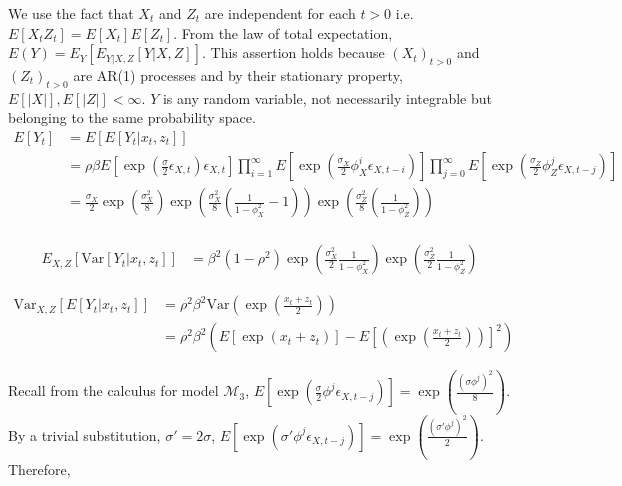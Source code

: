 \documentclass[11pt,a4,twosided,singlespacing,titlepagenumber=on]{scrreprt}
\numberwithin{equation}{chapter} %
\theoremstyle{remark}
\begin{document}
\noindent
We use the fact that $X_t$ and $Z_t$ are independent for each $t > 0$ i.e. $E[X_t Z_t] = E[X_t] E[Z_t]$.
\noindent
From the law of total expectation, $E(Y) = E_Y\left[ E_{Y|X,Z}[Y | X, Z] \right]$. This assertion holds because $(X_t)_{t>0}$ and $(Z_t)_{t>0}$ are AR(1) processes and by their stationary property, $E[|X|],E[|Z|] < \infty$. $Y$ is any random variable, not necessarily integrable but belonging to the same probability space.
\begin{align*}
E\left[ Y_t \right] &= E\left[ E[Y_t | x_t, z_t] \right] \\
                                  &= \rho \beta E\left[\exp \left( \frac{\sigma}{2} \epsilon_{X,t} \right) \epsilon_{X,t} \right] \prod_{i=1}^\infty E\left[\exp \left( \frac{\sigma_X}{2} \phi_X^i \epsilon_{X, t-i} \right)  \right]  \prod_{j=0}^\infty E\left[\exp \left( \frac{\sigma_Z}{2} \phi_Z^j \epsilon_{X, t-j} \right)  \right] \\
                  &= \frac{\sigma_X}{2} \exp \left(\frac{\sigma_X^2}{8}\right) \exp \left( \frac{\sigma_X^2}{8} \left(\frac{1}{1-\phi_X^{2}} - 1\right)\right) \exp \left( \frac{\sigma_Z^2}{8} \left(\frac{1}{1-\phi_Z^{2}}\right)\right) \\
\end{align*}



\begin{align*}
E_{X,Z}\left[ \text{Var}[Y_t | x_t, z_t] \right] &= \beta^2 (1-\rho^2) \exp \left( \frac{\sigma_X^2}{2} \frac{1}{1-\phi_X^{2}}\right) \exp \left( \frac{\sigma_Z^2}{2} \frac{1}{1-\phi_Z^{2}}\right)
\end{align*}


\begin{align*}
\text{Var}_{X,Z} \left[ E[Y_t | x_t, z_t] \right] &= \rho^2 \beta^2 \text{Var} \left( \exp \left(\frac{x_t + z_t}{2}\right) \right) \\
                                                  &= \rho^2 \beta^2 \left( E \left[ \exp \left(x_t + z_t\right) \right] - E \left[ \left( \exp \left(\frac{x_t + z_t}{2}\right) \right) \right]^2 \right)
\end{align*}

\noindent
Recall from the calculus for model $\mathcal{M}_3$, $E\left[\exp \left( \frac{\sigma}{2} \phi^j \epsilon_{X, t-j} \right) \right] = \exp \left(\frac{(\sigma\phi^j)^2}{8} \right)$. By a trivial substitution, $\sigma' = 2 \sigma$, $E\left[\exp \left( \sigma' \phi^j \epsilon_{X, t-j} \right) \right] = \exp \left(\frac{(\sigma'\phi^j)^2}{2} \right)$. Therefore,
\end{document}
